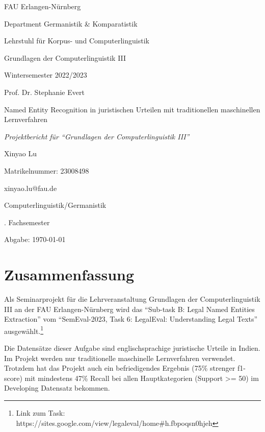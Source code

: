 \documentclass[paper=A4, ngerman, fontsize=12pt]{article}
\begin{document}
	\thispagestyle{empty}
	{\large\noindent
		FAU Erlangen-Nürnberg
		
		\medskip\noindent
		Department Germanistik \& Komparatistik
		
		\medskip\noindent
		Lehrstuhl für Korpus- und Computerlinguistik
		
		\medskip\noindent
		Grundlagen der Computerlinguistik III
		
		\medskip\noindent
		Wintersemester 2022/2023
		
		\medskip\noindent
		Prof. Dr. Stephanie Evert
	}
	
	\vspace*{\fill}
	\begin{center}
		{\large Named Entity Recognition in juristischen Urteilen mit traditionellen maschinellen Lernverfahren}
		
		\medskip\noindent
		{\large
			\textit{Projektbericht für \enquote{Grundlagen der Computerlinguistik III}}
		}
		
	\end{center}
	\vspace*{\fill}
	
	
	\mbox{}
	\vfill
	{\large
		\noindent
		Xinyao Lu
		
		\medskip\noindent
		Matrikelnummer: 23008498
		
		\medskip\noindent
		xinyao.lu@fau.de
		
		\medskip\noindent
		Computerlinguistik/Germanistik
		
		\medskip{}. Fachsemester
		
		\medskip\noindent
		Abgabe: \today\\
	}
	
	\clearpage
	
	
	\thispagestyle{empty}
	\tableofcontents
	\listoffigures
	
	\clearpage
	
	\section{Zusammenfassung}
	\noindent
	Als Seminarprojekt für die Lehrveranstaltung Grundlagen der Computerlinguistik III an der FAU Erlangen-Nürnberg wird das \enquote{Sub-task B: Legal Named Entities Extraction} vom \enquote{SemEval-2023, Task 6: LegalEval: Understanding Legal Texts} ausgewählt.\footnote{Link zum Task: https://sites.google.com/view/legaleval/home\#h.fbpoqsn0hjeh}
	
	Die Datensätze dieser Aufgabe sind englischsprachige juristische Urteile in Indien. Im Projekt werden nur traditionelle maschinelle Lernverfahren verwendet. Trotzdem hat das Projekt auch ein befriedigendes Ergebnis (75\% strenger f1-score) mit mindestens 47\% Recall bei allen Hauptkategorien (Support >= 50) im Developing Datensatz bekommen. 
	
\end{document}
